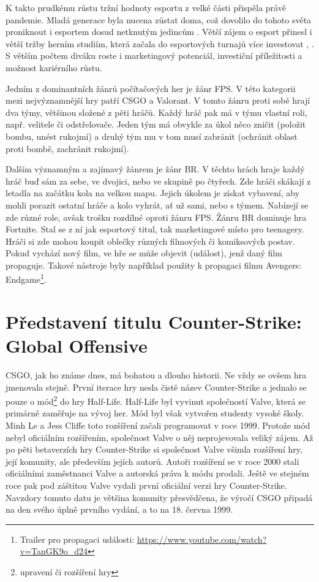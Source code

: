 K takto prudkému růstu tržní hodnoty esportu z velké části přispěla právě pandemie. Mladá generace byla nucena zůstat doma, což dovolilo do tohoto světa proniknout i esportem
dosud netknutým jedincům . Větší zájem o esport přinesl i větší tržby herním studiím, která začala do esportových turnajů více investovat \cite{professeur_esea_2022},
\cite{liquipedianet_pgl_2021}. S větším počtem diváku roste i marketingový potenciál, investiční příležitosti a možnost kariérního růstu.

Jedním z dominantních žánrů počítačových her je žánr \acf{FPS}. V této kategorii mezi nejvýznamnější hry patří \ac{CSGO} a Valorant. V tomto žánru proti sobě hrají dva týmy,
většinou složené z pěti hráčů. Každý hráč pak má v týmu vlastní roli, např. velitele či odstřelovače. Jeden tým má obvykle za úkol něco zničit (položit bombu, unést rukojmí)
a druhý tým mu v tom musí zabránit (ochránit oblast proti bombě, zachránit rukojmí).

Dalším významným a zajímavý žánrem je žánr \acf{BR}. V těchto hrách hraje každý hráč buď sám za sebe, ve dvojici, nebo ve skupině po čtyřech. Zde hráči skákají z letadla na
začátku kola na velkou mapu. Jejich úkolem je získat vybavení, aby mohli porazit ostatní hráče a kolo vyhrát, ať už sami, nebo s týmem. Nabízejí se zde různé role, avšak trošku
rozdílné oproti žánru \ac{FPS}. Žánru BR dominuje hra Fortnite. Stal se z ní jak esportový titul, tak marketingové místo pro teenagery.
Hráči si zde mohou koupit oblečky různých filmových či komiksových postav. Pokud vychází nový film, ve hře se může objevit  (událost),
jenž daný film propaguje. Takové nástroje byly například použity k propagaci filmu Avengers: Endgame\footnote{Trailer pro propagaci události:
\url{https://www.youtube.com/watch?v=TanGK9o_d24}}.

\section{Představení titulu Counter-Strike: Global Offensive}
\ac{CSGO}, jak ho známe dnes, má bohatou a dlouho historii. Ne vždy se ovšem hra jmenovala stejně. První iterace hry nesla čistě název Counter-Strike a jednalo se pouze o
mód\footnote{upravení či rozšíření hry} do hry Half-Life. Half-Life byl vyvinut společností Valve, která se primárně zaměřuje na vývoj her. Mód byl však
vytvořen studenty vysoké školy. Minh Le a Jess Cliffe toto rozšíření začali programovat v roce 1999. Protože mód nebyl oficiálním rozšířením, společnost Valve o něj neprojevovala
veliký zájem. Až po pěti betaverzích hry Counter-Strike si společnost Valve všimla rozšíření hry, její komunity, ale především jejích autorů. Autoři rozšíření se v roce 2000 stali
oficiálními zaměstnanci Valve a autorská práva k módu prodali. Ještě ve stejném roce pak pod záštitou Valve vydali první oficiální verzi hry Counter-Strike. Navzdory tomuto
 datu je většina komunity přesvědčena, že výročí \ac{CSGO} připadá na den svého úplně prvního vydání, a to na 18. června 1999.

